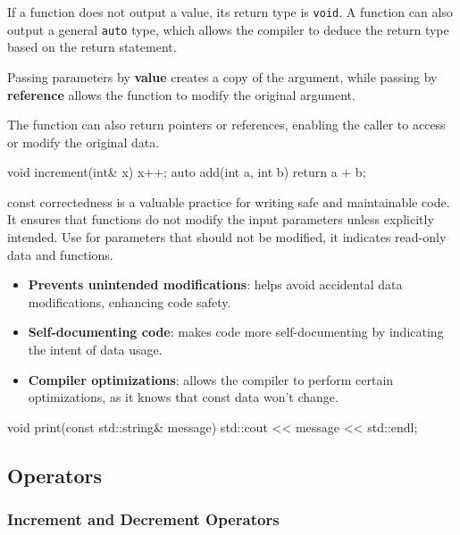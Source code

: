 If a function does not output a value, its return type is \texttt{void}.    
A function can also output a general \texttt{auto} type, which allows the compiler to deduce the return type based on the return statement.

Passing parameters by \textbf{value} creates a copy of the argument, while passing by \textbf{reference} allows the function to modify the original argument.

The function can also return pointers or references, enabling the caller to access or modify the original data.

\begin{exampleblock}
    \begin{codeblock}[language=C++]
void increment(int& x) {
    x++;
}
auto add(int a, int b) {
    return a + b;
}
    \end{codeblock}
\end{exampleblock}

\begin{warningblock}
    const correctedness is a valuable practice for writing safe and maintainable code. It ensures that functions do not modify the input parameters unless explicitly intended.
    Use  for parameters that should not be modified, it indicates read-only data and functions. 
    \begin{itemize}
        \item \textbf{Prevents unintended modifications}: helps avoid accidental data modifications, enhancing
        code safety.
        \item \textbf{Self-documenting code}: makes code more self-documenting by indicating the intent of data
        usage.
        \item \textbf{Compiler optimizations}: allows the compiler to perform certain optimizations, as it knows that
        const data won't change.
    \end{itemize}
    \begin{codeblock}[language=C++]
void print(const std::string& message) {
    std::cout << message << std::endl;
}
    \end{codeblock}
\end{warningblock}


\newpage
\subsection{Operators}

\subsubsection{Increment and Decrement Operators}

